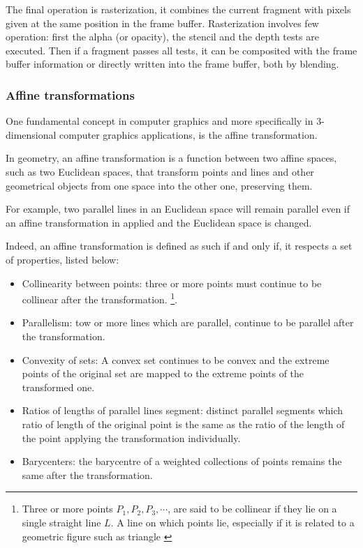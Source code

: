 \documentclass[12pt,a4paper]{extarticle}
\newcommand{\linespace}{\vspace{0pt}}
\begin{document}
The final operation is rasterization, it combines the current fragment with pixels given at the same position in the frame buffer. Rasterization involves few operation: first the alpha (or opacity), the stencil and the depth tests are executed. Then if a fragment passes all tests, it can be composited with the frame buffer information or directly written into the frame buffer, both by blending.
\subsubsection{Affine transformations}
One fundamental concept in computer graphics and more specifically in 3-dimensional computer graphics applications, is the affine transformation.
\linespace

In geometry, an affine transformation is a function between two affine spaces, such as two Euclidean spaces, that transform points and lines and other geometrical objects from one space into the other one, preserving them. 

For example, two parallel lines in an Euclidean space will remain parallel even if an affine transformation in applied and the Euclidean space is changed.

Indeed, an affine transformation is defined as such if and only if, it respects a set of properties, listed below:
\begin{itemize}
\item Collinearity between points: three or more points must continue to be collinear after the transformation. \footnote{Three or more points $P_{1},P_{2},P_{3},\cdots$, are said to be collinear if they lie on a single straight line $L$. A line on which points lie, especially if it is related to a geometric figure such as triangle  \cite{Weisstein2019Aug}}.
\item Parallelism: tow or more lines which are parallel, continue to be parallel after the transformation.
\item Convexity of sets: A convex set continues to be convex and the extreme points of the original set are mapped to the extreme points of the transformed one.
\item Ratios of lengths of parallel lines segment: distinct parallel segments which ratio of length of the original point is the same as the ratio of the length of the point applying the transformation individually.
\item Barycenters: the barycentre of a weighted collections of points remains the same after the transformation.
\end{itemize}
\end{document}
